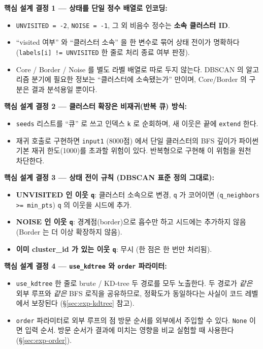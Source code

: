 \documentclass[12pt, a4paper]{article}
\begin{document}
\noindent\textbf{핵심 설계 결정 1 --- 상태를 단일 정수 배열로 인코딩:}
\begin{itemize}
    \item \texttt{UNVISITED = -2}, \texttt{NOISE = -1}, 그 외 비음수 정수는 \textbf{소속 클러스터 ID}.
    \item ``visited 여부'' 와 ``클러스터 소속'' 을 한 변수로 묶어 상태 전이가 명확하다 (\texttt{labels[i] != UNVISITED} 한 줄로 처리 종료 여부 판정).
    \item Core / Border / Noise 를 별도 라벨 배열로 따로 두지 않는다. DBSCAN 의 알고리즘 분기에 필요한 정보는 ``클러스터에 소속됐는가'' 만이며, Core/Border 의 구분은 결과 분석용일 뿐이다.
\end{itemize}

\noindent\textbf{핵심 설계 결정 2 --- 클러스터 확장은 비재귀(반복 큐) 방식:}
\begin{itemize}
    \item \texttt{seeds} 리스트를 ``큐'' 로 쓰고 인덱스 \texttt{k} 로 순회하며, 새 이웃은 끝에 \texttt{extend} 한다.
    \item 재귀 호출로 구현하면 \texttt{input1} (8000점) 에서 단일 클러스터의 BFS 깊이가 파이썬 기본 재귀 한도(1000)를 초과할 위험이 있다. 반복형으로 구현해 이 위험을 원천 차단한다.
\end{itemize}

\noindent\textbf{핵심 설계 결정 3 --- 상태 전이 규칙 (DBSCAN 표준 정의 그대로):}
\begin{itemize}
    \item \textbf{UNVISITED 인 이웃 \texttt{q}}: 클러스터 소속으로 변경, \texttt{q} 가 코어이면 (\texttt{q\_neighbors >= min\_pts}) \texttt{q} 의 이웃을 시드에 추가.
    \item \textbf{NOISE 인 이웃 \texttt{q}}: 경계점(border)으로 흡수만 하고 시드에는 추가하지 않음 (Border 는 더 이상 확장하지 않음).
    \item \textbf{이미 cluster\_id 가 있는 이웃 \texttt{q}}: 무시 (한 점은 한 번만 처리됨).
\end{itemize}

\noindent\textbf{핵심 설계 결정 4 --- \texttt{use\_kdtree} 와 \texttt{order} 파라미터:}
\begin{itemize}
    \item \texttt{use\_kdtree} 한 줄로 brute / KD-tree 두 경로를 모두 노출한다. 두 경로가 \emph{같은} 외부 루프와 \emph{같은} BFS 로직을 공유하므로, 정확도가 동일하다는 사실이 코드 레벨에서 보장된다 (\S\ref{sec:exp-kdtree} 참고).
    \item \texttt{order} 파라미터로 외부 루프의 점 방문 순서를 외부에서 주입할 수 있다. \texttt{None} 이면 입력 순서. 방문 순서가 결과에 미치는 영향을 비교 실험할 때 사용한다 (\S\ref{sec:exp-order}).
\end{itemize}
\end{document}
